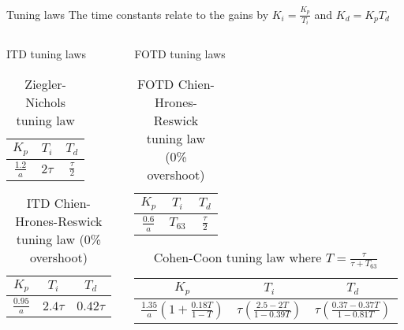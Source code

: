 \documentclass[9pt]{beamer-control}
\begin{document}

\begin{frame}{Tuning laws}
	\centering
	The time constants relate to the gains by $K_i= \frac{K_p}{T_i}$ and $K_d = K_p T_d$\\
	\vfill
	
	\begin{columns}
		\begin{column}{0.5\textwidth}
			ITD tuning laws
			\begin{table}
				\centering
				\begin{tabular}{|c|c|c|}
					\hline
					$K_p$ & $T_i$ & $T_d$\\
					\hline
					$\frac{1.2}{a}$ & $2\tau$ & $\frac{\tau}{2}$\\
					\hline	
				\end{tabular}
				\caption{Ziegler-Nichols tuning law}
			\end{table}
			
			\begin{table}
				\centering
				\begin{tabular}{|c|c|c|}
					\hline
					$K_p$ & $T_i$ & $T_d$\\
					\hline
					$\frac{0.95}{a}$ & $2.4 \tau$ & $0.42 \tau$\\
					\hline	
				\end{tabular}
				\caption{ITD Chien-Hrones-Reswick tuning law (0\% overshoot)}
			\end{table}
		\end{column}
		\begin{column}{0.5\textwidth} 
			
			FOTD tuning laws
			\begin{table}
				\centering
				\begin{tabular}{|c|c|c|}
					\hline
					$K_p$ & $T_i$ & $T_d$\\
					\hline
					$\frac{0.6}{a}$ & $T_{63}$ & $\frac{\tau}{2}$\\
					\hline	
				\end{tabular}
				\caption{FOTD Chien-Hrones-Reswick tuning law (0\% overshoot)}
			\end{table}
			
			\begin{table}
				\centering
				\begin{tabular}{|c|c|c|}
					\hline
					$K_p$ & $T_i$ & $T_d$\\
					\hline
					\tiny{$\frac{1.35}{a}\left(1 + \frac{0.18 T}{1-T} \right)$} & \tiny{$ \tau\left( \frac{2.5-2T}{1-0.39T} \right) $} & \tiny{$\tau \left( \frac{0.37-0.37T}{1-0.81T} \right)$}\\
					\hline	
				\end{tabular}
				\caption{Cohen-Coon tuning law where $T=\frac{\tau}{\tau+T_{63}}$}
			\end{table}
		\end{column}
	\end{columns}
	
	
\end{frame}
\end{document}
